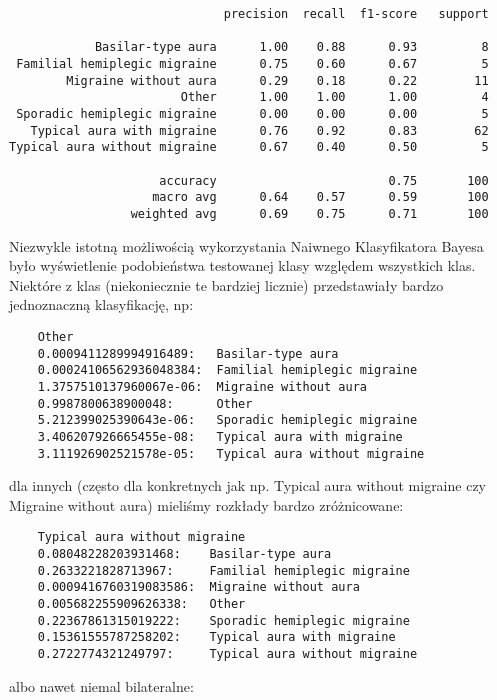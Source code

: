 \begin{verbatim}
                              precision  recall  f1-score   support

            Basilar-type aura      1.00    0.88      0.93         8
 Familial hemiplegic migraine      0.75    0.60      0.67         5
        Migraine without aura      0.29    0.18      0.22        11
                        Other      1.00    1.00      1.00         4
 Sporadic hemiplegic migraine      0.00    0.00      0.00         5
   Typical aura with migraine      0.76    0.92      0.83        62
Typical aura without migraine      0.67    0.40      0.50         5

                     accuracy                        0.75       100
                    macro avg      0.64    0.57      0.59       100
                 weighted avg      0.69    0.75      0.71       100
\end{verbatim}

Niezwykle istotną możliwością wykorzystania Naiwnego Klasyfikatora Bayesa było wyświetlenie podobieństwa testowanej klasy względem wszystkich klas.\\

Niektóre z klas (niekoniecznie te bardziej licznie) przedstawiały bardzo jednoznaczną klasyfikację, np:\\

\begin{verbatim}
    Other
    0.0009411289994916489: 	 Basilar-type aura
    0.00024106562936048384:  Familial hemiplegic migraine
    1.3757510137960067e-06:  Migraine without aura
    0.9987800638900048:      Other
    5.212399025390643e-06: 	 Sporadic hemiplegic migraine
    3.406207926665455e-08: 	 Typical aura with migraine
    3.111926902521578e-05: 	 Typical aura without migraine
\end{verbatim}

dla innych (często dla konkretnych jak np. Typical aura without migraine czy Migraine without aura) mieliśmy rozkłady bardzo zróżnicowane:

\begin{verbatim}
    Typical aura without migraine
    0.08048228203931468:    Basilar-type aura
    0.2633221828713967:     Familial hemiplegic migraine
    0.0009416760319083586:  Migraine without aura
    0.005682255909626338:   Other
    0.22367861315019222:    Sporadic hemiplegic migraine
    0.15361555787258202:    Typical aura with migraine
    0.2722774321249797:     Typical aura without migraine
\end{verbatim}
albo nawet niemal bilateralne:

